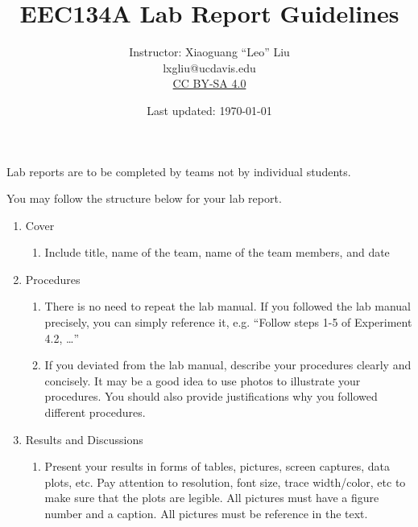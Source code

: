 \documentclass[letterpaper, 11pt]{article}
\title{EEC134A Lab Report Guidelines}
\author{Instructor: Xiaoguang ``Leo'' Liu \\ lxgliu@ucdavis.edu \\ \small \href{http://creativecommons.org/licenses/by-sa/4.0/}{CC BY-SA 4.0}}
\date{Last updated: \today}
\begin{document}
\maketitle

Lab reports are to be completed by teams not by individual students. 

You may follow the structure below for your lab report. 

\begin{enumerate}
	\item Cover
		\begin{enumerate}
			\item Include title, name of the team, name of the team members, and date 
		\end{enumerate}
	\item Procedures
		\begin{enumerate}
			\item There is no need to repeat the lab manual. If you followed the lab manual precisely, you can simply reference it, e.g. “Follow steps 1-5 of Experiment 4.2, …” 
			
			\item If you deviated from the lab manual, describe your procedures clearly and concisely. It may be a good idea to use photos to illustrate your procedures. You should also provide justifications why you followed different procedures. 
		\end{enumerate}
	\item Results and Discussions
		\begin{enumerate}
			\item Present your results in forms of tables, pictures, screen captures, data plots, etc. Pay attention to resolution, font size, trace width/color, etc to make sure that the plots are legible. All pictures must have a figure number and a caption. All pictures must be reference in the text.
			

\end{enumerate}
\end{enumerate}
\end{document}
